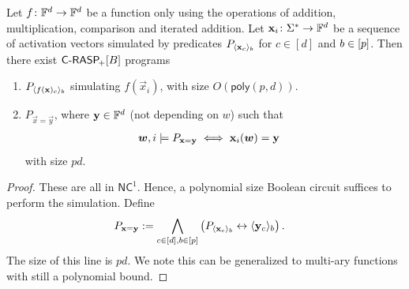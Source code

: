 \begin{lemma}\label{lem:finite_function_poly}
    Let $f\colon\mathbb{F}^{d}\to\mathbb{F}^{d}$ be a function only using the operations of addition, multiplication, comparison and iterated addition.
    Let $\mathbf{x}_i\colon\Sigma^*\to\mathbb{F}^d$ be a sequence of activation vectors simulated by predicates $P_{\langle\mathbf{x}_c\rangle_{{b}}}$ for $c\in[d]$ and ${b}\in[{p}]$. 
    Then there exist ${\mathsf{C\textsf{-}RASP}_{\!+}}[B]$ programs 
    \begin{enumerate}[label=(\alph*)]
    \item\label{item:function} $P_{\langle f(\mathbf{x})_c\rangle_{{b}}}$ simulating $f(\vec{x}_i)$, with size $O(\mathsf{poly}(p,d))$.
    \item\label{item:constant} $P_{\vec{x} = \vec{y}}$, where $\mathbf{y} \in \mathbb{F}^d$ (not depending on $w$) such that
    \begin{align*}
    {{\boldsymbol{w}}},i\models P_{\mathbf{x}=\mathbf{y}} &\iff \mathbf{x}_{i}({{\boldsymbol{w}}})=\mathbf{y}
    \end{align*} 
    with size $pd$.
    \end{enumerate}
\end{lemma}
\begin{proof}
     These are all in $\mathsf{NC}^1$. 
    Hence, a polynomial size Boolean circuit suffices to perform the simulation.
     Define
    \begin{align*}
        P_{\mathbf{x}=\mathbf{y}} &:= \bigwedge_{c\in[d],{b}\in[{p}]} \left( 
        P_{\langle\mathbf{x}_c\rangle_{{b}}} 
        \leftrightarrow \langle\mathbf{y}_c\rangle_{{b}} \right).
    \end{align*}
    The size of this line is $pd$. 
    We note this can be generalized to multi-ary functions with still a polynomial bound. 
\end{proof}

